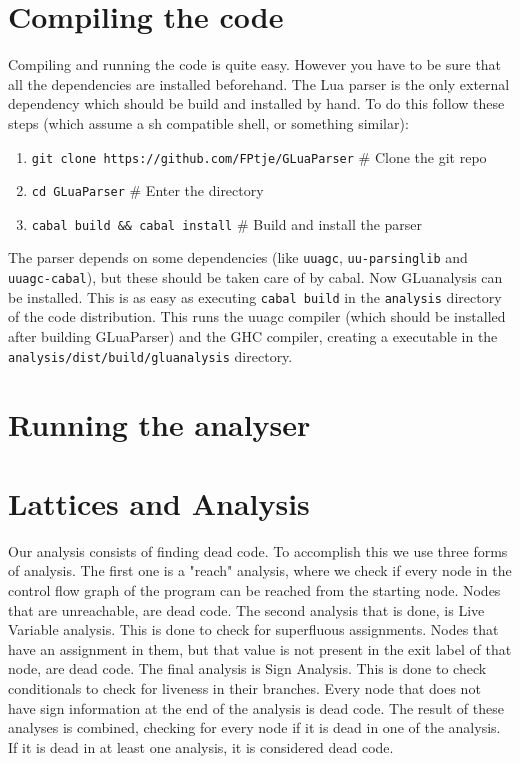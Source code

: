 \documentclass[10pt]{article}
\begin{document}
\section{Compiling the code}
Compiling and running the code is quite easy. However you have to be sure that all the dependencies are installed beforehand. The Lua parser is the only external dependency which should be build and installed by hand. To do this follow these steps (which assume a sh compatible shell, or something similar):

\begin{enumerate}
	\item \texttt{git clone https://github.com/FPtje/GLuaParser} \# Clone the git repo
	\item \texttt{cd GLuaParser} \# Enter the directory
	\item \texttt{cabal build \&\& cabal install} \# Build and install the parser
\end{enumerate}

The parser depends on some dependencies (like \texttt{uuagc}, \texttt{uu-parsinglib} and \texttt{uuagc-cabal}), but these should be taken care of by cabal. Now GLuanalysis can be installed. This is as easy as executing \texttt{cabal build} in the \texttt{analysis} directory of the code distribution. This runs the uuagc compiler (which should be installed after building GLuaParser) and the GHC compiler, creating a executable in the \texttt{analysis/dist/build/gluanalysis} directory.

\section{Running the analyser}


\section{Lattices and Analysis}
Our analysis consists of finding dead code. To accomplish this we use three forms of analysis. The first one is a "reach" analysis, where we check if every node in the control flow graph of the program can be reached from the starting node. Nodes that are unreachable, are dead code.
The second analysis that is done, is Live Variable analysis. This is done to check for superfluous assignments. Nodes that have an assignment in them, but that value is not present in the exit label of that node, are dead code.
The final analysis is Sign Analysis. This is done to check conditionals to check for liveness in their branches. Every node that does not have sign information at the end of the analysis is dead code.
The result of these analyses is combined, checking for every node if it is dead in one of the analysis. If it is dead in at least one analysis, it is considered dead code.\\
\end{document}
